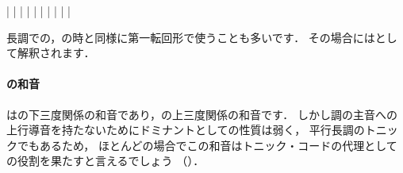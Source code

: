 \documentclass[dvipdfmx,uplatex,b5paper,openany,jbase=12Q,nomag*,textwidth-limit=44%
               ]{gachimuchi}
\begin{document}
\begin{floatMusic}[pos=ht]%
  \Startpiece%
  \znotes|\en
  \NOTes
  |%
  \en\bar
  \NOTEs
  |%
  \en\doublebar
  \NOTEs
  |%
  \en\bar
  \NOTEs
  |%
  \en\doublebar
  \NOTes
  |%
  \en\bar
  \NOTes
  \Mryaku\sk%
  |%
  \Mryaku\sk
  \en\setdoublebar
  \endpiece%
\end{floatMusic}

長調での\Gnii\Min ，\Gnii\Dimt の時と同様に第一転回形で使うことも多いです．
その場合にはとして解釈されます．

\paragraph{\bFlat\Gniii の和音}
\bFlat\Gniii は\Gnv\Min の下三度関係の和音であり，\Gni\Min の上三度関係の和音です．
しかし調の主音への上行導音を持たないためにドミナントとしての性質は弱く，
平行長調のトニックでもあるため，
ほとんどの場合でこの和音はトニック・コードの代理としての役割を果たすと言えるでしょう
（）．
\end{document}
